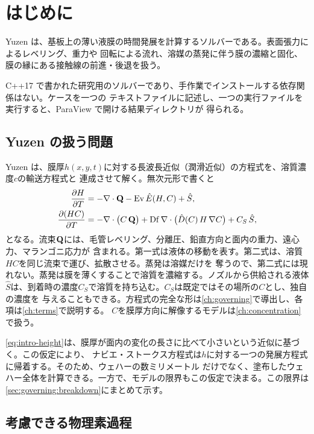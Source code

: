 \chapter{はじめに}
\label{ch:introduction}

Yuzen は、基板上の薄い液膜の時間発展を計算するソルバーである。表面張力によるレベリング、重力や
回転による流れ、溶媒の蒸発に伴う膜の濃縮と固化、膜の縁にある接触線の前進・後退を扱う。

C++17 で書かれた研究用のソルバーであり、手作業でインストールする依存関係はない。ケースを一つの
テキストファイルに記述し、一つの実行ファイルを実行すると、ParaView で開ける結果ディレクトリが
得られる。

\section{Yuzen の扱う問題}
\label{sec:intro:what}

Yuzen は、膜厚$h(x,y,t)$に対する長波長近似（潤滑近似）の方程式を、溶質濃度$c$の輸送方程式と
連成させて解く。無次元形で書くと
%
\begin{align}
  \frac{\partial H}{\partial T} &= -\nabla\cdot\mathbf{Q} - \mathrm{Ev}\,\hat{E}(H,C) + \hat{S},
  \label{eq:intro-height}\\
  \frac{\partial (HC)}{\partial T} &= -\nabla\cdot\bigl(C\,\mathbf{Q}\bigr)
    + \mathrm{Df}\,\nabla\cdot\bigl(\hat{D}(C)\,H\,\nabla C\bigr) + C_S\,\hat{S},
  \label{eq:intro-conc}
\end{align}
%
となる。流束$\mathbf{Q}$には、毛管レベリング、分離圧、鉛直方向と面内の重力、遠心力、マランゴニ応力が
含まれる。第一式は液体の移動を表す。第二式は、溶質$HC$を同じ流束で運び、拡散させる。蒸発は溶媒だけを
奪うので、第二式には現れない。蒸発は膜を薄くすることで溶質を濃縮する。ノズルから供給される液体
$\hat{S}$は、到着時の濃度$C_S$で溶質を持ち込む。$C_S$は既定ではその場所の$C$とし、独自の濃度を
与えることもできる。方程式の完全な形は\cref{ch:governing}で導出し、各項は\cref{ch:terms}で説明する。
$C$を膜厚方向に解像するモデルは\cref{ch:concentration}で扱う。

\cref{eq:intro-height}は、膜厚が面内の変化の長さに比べて小さいという近似に基づく。この仮定により、
ナビエ・ストークス方程式は$h$に対する一つの発展方程式に帰着する。そのため、ウェハーの数ミリメートル
だけでなく、塗布したウェハー全体を計算できる。一方で、モデルの限界もこの仮定で決まる。この限界は
\cref{sec:governing:breakdown}にまとめて示す。

\section{考慮できる物理素過程}
\label{sec:intro:physics}

